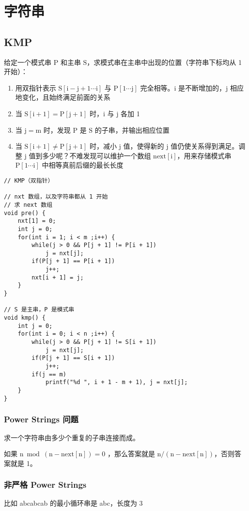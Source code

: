 \documentclass[UTF8]{article}
\begin{document}
\newpage
\section{字符串}

\subsection{KMP}
给定一个模式串 $\mathrm{P}$ 和主串 $\mathrm{S}$，求模式串在主串中出现的位置（字符串下标均从 1 开始）：

\begin{enumerate}
	\item 用双指针表示 $\mathrm{S[i-j+1\cdots i]}$ 与 $\mathrm{P[1 \cdots j]}$ 完全相等。$\mathrm{i}$ 是不断增加的，$\mathrm{j}$ 相应地变化，且始终满足前面的关系
	\item 当 $\mathrm{S[i+1] = P[j+1]}$ 时，$\mathrm{i}$ 与 $\mathrm{j}$ 各加 1
	\item 当 $\mathrm{j=m}$ 时，发现 $\mathrm{P}$ 是 $\mathrm{S}$ 的子串，并输出相应位置
	\item 当 $\mathrm{S[i + 1] \neq P[j+1]}$ 时，减小 $\mathrm{j}$ 值，使得新的 $\mathrm{j}$ 值仍使关系得到满足。调整 $\mathrm{j}$ 值到多少呢？不难发现可以维护一个数组 $\mathrm{next[i]}$，用来存储模式串 $\mathrm{P[1 \cdots i]}$ 中相等真前后缀的最长长度
\end{enumerate}

\begin{lstlisting}[caption=KMP]
// KMP（双指针）

// nxt 数组，以及字符串都从 1 开始
// 求 next 数组
void pre() {
	nxt[1] = 0;
	int j = 0;
	for(int i = 1; i < m ;i++) {
		while(j > 0 && P[j + 1] != P[i + 1])
			j = nxt[j];
		if(P[j + 1] == P[i + 1])
			j++;
		nxt[i + 1] = j; 
	}
}

// S 是主串，P 是模式串
void kmp() {
	int j = 0;
	for(int i = 0; i < n ;i++) {
		while(j > 0 && P[j + 1] != S[i + 1])
			j = nxt[j];
		if(P[j + 1] == S[i + 1])
			j++;
		if(j == m)
			printf("%d ", i + 1 - m + 1), j = nxt[j];
	}
}
\end{lstlisting}


\subsubsection{Power Strings 问题}
求一个字符串由多少个重复的子串连接而成。

如果 $\mathrm{n \bmod (n - next[n]) = 0}$  ，那么答案就是 $\mathrm{n / (n - next[n])}$，否则答案就是 1。

\subsubsection{非严格 Power Strings}
比如 abcabcab 的最小循环串是 abc，长度为 $\mathrm{3}$
\end{document}
